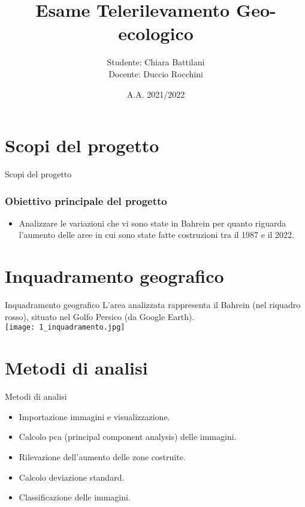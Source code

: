 \documentclass{beamer}
\title{Esame Telerilevamento Geo-ecologico}
\institute{Alma Mater Studiorum - Università di Bologna\\Telerilevamento Geo-ecologico}
\author{Studente: Chiara Battilani \\ Docente: Duccio Rocchini}
\date{A.A. 2021/2022}
\begin{document}
\maketitle



\section{Scopi del progetto}

\begin{frame}{Scopi del progetto}
\frametitle{Obiettivo principale del progetto}
\begin{itemize}
\item Analizzare le variazioni che vi sono state in Bahrein per quanto riguarda l'aumento delle aree in cui sono state fatte costruzioni tra il 1987 e il 2022.
\end{itemize}
\end{frame}

\section{Inquadramento geografico}

\begin{frame}{Inquadramento geografico}
L'area analizzata rappresenta il Bahrein (nel riquadro rosso), situato nel Golfo Persico (da Google Earth).\\
\texttt{[image: 1\_inquadramento.jpg]}
\centering
\end{frame}

\section{Metodi di analisi}

\begin{frame}{Metodi di analisi}
\begin{itemize}
\item Importazione immagini e visualizzazione.
\bigskip
\item Calcolo pca (principal component analysis) delle immagini.
\bigskip
\item Rilevazione dell'aumento delle zone costruite.
\bigskip
\item Calcolo deviazione standard.
\bigskip
\item Classificazione delle immagini.
\end{itemize}
\end{frame}
\end{document}
